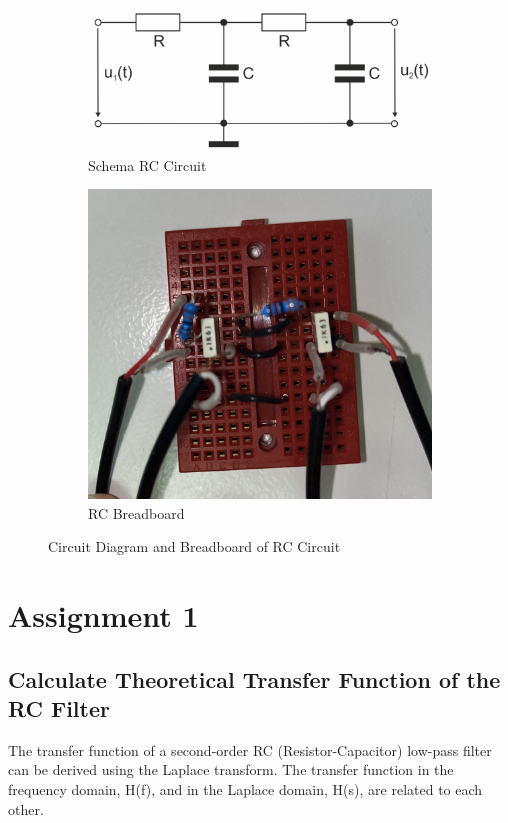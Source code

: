 \documentclass[
	a4paper,
	11pt,
]{article}
\begin{document}
\begin{figure}[h]
    \centering
    \begin{subfigure}[b]{0.47\textwidth}
        \centering
        \includegraphics[width=0.9\linewidth]{figure/A0/schemaRC.jpg}
        {{\small  Schema RC Circuit}}  
    \end{subfigure}
    \hfill
    \begin{subfigure}[b]{0.47\textwidth}
        \centering
        \includegraphics[width=0.9\linewidth]{figure/A0/RC_Breadboard.jpg}
        {{\small RC Breadboard}}   
    \end{subfigure}
    \caption{Circuit Diagram and Breadboard of RC Circuit}
    \label{fig:RC_shema_and_bread}
\end{figure}

\section{Assignment 1}
\subsection{Calculate Theoretical Transfer Function of the RC Filter}
The transfer function of a second-order RC (Resistor-Capacitor) low-pass filter can be derived using the Laplace transform. The transfer function in the frequency domain, H(f), and in the Laplace domain, H(s), are related to each other. 
\end{document}

